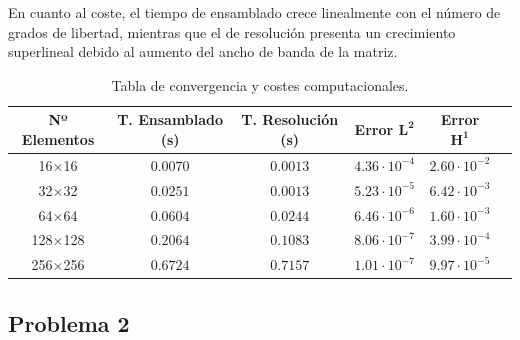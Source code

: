 \documentclass[11pt]{book}
\theoremstyle{plain} %
\theoremstyle{definition} %
\theoremstyle{definition} %
\begin{document}
    En cuanto al coste, el tiempo de ensamblado crece linealmente con el número de grados de libertad, mientras que el de resolución presenta un crecimiento superlineal debido al aumento del ancho de banda de la matriz.
\begin{table}[htbp]
    \centering
    \setlength{\tabcolsep}{4pt} %
    \caption{Tabla de convergencia y costes computacionales.}
    \label{tab:resultados2d.1}
    \vspace{-0.2cm}
    \begin{tabular}{cccccc}
        \toprule
        \textbf{Nº Elementos} & \textbf{T. Ensamblado (s)} & \textbf{T. Resolución (s)} & \textbf{Error} $\boldsymbol{L^2}$ & \textbf{Error} $\boldsymbol{H^1}$ \\
        \midrule
        16$\times$16  & $0.0070$ & $0.0013$ & $4.36 \cdot 10^{-4}$ & $2.60 \cdot 10^{-2}$ \\
        32$\times$32  & $0.0251$ & $0.0013$ & $5.23 \cdot 10^{-5}$ & $6.42 \cdot 10^{-3}$ \\
        64$\times$64  & $0.0604$ & $0.0244$ & $6.46 \cdot 10^{-6}$ & $1.60 \cdot 10^{-3}$ \\
        128$\times$128 & $0.2064$ & $0.1083$ & $8.06 \cdot 10^{-7}$ & $3.99 \cdot 10^{-4}$ \\
        256$\times$256 & $0.6724$ & $0.7157$ & $1.01 \cdot 10^{-7}$ & $9.97 \cdot 10^{-5}$ \\
        \bottomrule
    \end{tabular}
\end{table}


\subsection{Problema 2}
\end{document}

